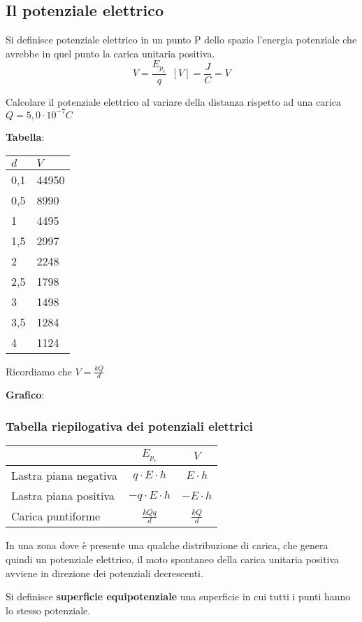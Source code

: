 \subsection{Il potenziale elettrico}
    \par Si definisce potenziale elettrico in un punto P dello spazio l'energia potenziale che avrebbe in quel punto la carica unitaria positiva.
    \begin{equation} \label{eq:46potenzialeElettrico}
        V=\frac{E_{p_e}}{q} \enspace [V]=\frac{J}{C}=V
    \end{equation}
    \esempio %
    \par Calcolare il potenziale elettrico al variare della distanza rispetto ad una carica $Q=5,0\cdot10^{-7}C$
    \par \textbf{Tabella}: \par \begin{tabular}{| l | l |}
        \hline
        $d$ & $V$\\ \hline
        0,1 & 44950\\ \hline
        0,5 & 8990\\ \hline
        1 & 4495\\ \hline
        1,5 & 2997\\ \hline
        2 & 2248\\ \hline
        2,5 & 1798\\ \hline
        3 & 1498\\ \hline
        3,5 & 1284\\ \hline
        4 & 1124\\ \hline
    \end{tabular} Ricordiamo che $V=\frac{kQ}{d}$
    \par \textbf{Grafico}:\par 
    \subsubsection{Tabella riepilogativa dei potenziali elettrici}
    \begin{tabular}{| l | c | c |}
        \hline
        & $E_{p_e}$ & $V$\\ \hline
        Lastra piana negativa & $q \cdot E \cdot h$ & $E \cdot h$\\ \hline
        Lastra piana positiva & $-q \cdot E \cdot h$ & $-E \cdot h$\\ \hline
        Carica puntiforme & $\frac{kQq}{d}$ & $\frac{kQ}{d}$\\ \hline
    \end{tabular}
    \par In una zona dove è presente una qualche distribuzione di carica, che genera quindi un potenziale elettrico, il moto spontaneo della carica unitaria positiva avviene in direzione dei potenziali decrescenti.
    \par Si definisce \textbf{superficie equipotenziale} una superficie in cui tutti i punti hanno lo stesso potenziale.
